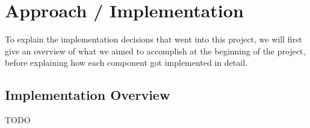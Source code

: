 
\chapter{Approach / Implementation}

To explain the implementation decisions that went into this project, we will first give an overview of what we aimed to accomplish at the beginning of the project, before explaining how each component got implemented in detail.

\section{Implementation Overview}

TODO

